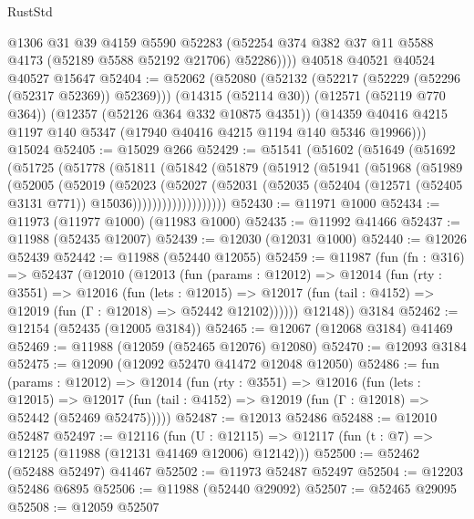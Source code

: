 \begin{lexlean}{RustStd}
\begin{coremodule}
          @1306
          @31
          @39
          @4159
          @5590
          @52283
          (@52254 @374 @382 @37 @11 @5588 @4173 (@52189 @5588 @52192 @21706) @52286))))
    @40518
    @40521
    @40524
    @40527
    @15647
@52404 := @52062
    (@52080
      (@52132 (@52217 (@52229 (@52296 (@52317 @52369)) @52369)))
      (@14315 (@52114 @30))
      (@12571 (@52119 @770 @364))
      (@12357 (@52126 @364 @332 @10875 @4351))
      (@14359 @40416 @4215 @1197 @140 @5347 (@17940 @40416 @4215 @1194 @140 @5346 @19966)))
    @15024
@52405 := @15029 @266
@52429 := @51541
    (@51602
      (@51649
        (@51692
          (@51725
            (@51778
              (@51811
                (@51842
                  (@51879
                    (@51912
                      (@51941
                        (@51968
                          (@51989
                            (@52005
                              (@52019
                                (@52023
                                  (@52027
                                    (@52031
                                      (@52035
                                        (@52404
                                          (@12571 (@52405 @3131 @771))
                                          @15036)))))))))))))))))))
@52430 := @11971 @1000
@52434 := @11973 (@11977 @1000) (@11983 @1000)
@52435 := @11992 @41466
@52437 := @11988 (@52435 @12007)
@52439 := @12030 (@12031 @1000)
@52440 := @12026 @52439
@52442 := @11988 (@52440 @12055)
@52459 := @11987
    (fun (fn : @316) =>
    @52437
      (@12010
        (@12013
          (fun (params : @12012) =>
          @12014
            (fun (rty : @3551) =>
            @12016
              (fun (lets : @12015) =>
              @12017 (fun (tail : @4152) => @12019 (fun (Γ : @12018) => @52442 @12102))))))
        @12148))
    @3184
@52462 := @12154 (@52435 (@12005 @3184))
@52465 := @12067 (@12068 @3184) @41469
@52469 := @11988 (@12059 (@52465 @12076) @12080)
@52470 := @12093 @3184
@52475 := @12090 (@12092 @52470 @41472 @12048 @12050)
@52486 := fun (params : @12012) =>
  @12014
    (fun (rty : @3551) =>
    @12016
      (fun (lets : @12015) =>
      @12017 (fun (tail : @4152) => @12019 (fun (Γ : @12018) => @52442 (@52469 @52475)))))
@52487 := @12013 @52486
@52488 := @12010 @52487
@52497 := @12116
    (fun (U : @12115) => @12117 (fun (t : @7) => @12125 (@11988 (@12131 @41469 @12006) @12142)))
@52500 := @52462 (@52488 @52497) @41467
@52502 := @11973 @52487 @52497
@52504 := @12203 @52486 @6895
@52506 := @11988 (@52440 @29092)
@52507 := @52465 @29095
@52508 := @12059 @52507

\end{coremodule}
\end{lexlean}
